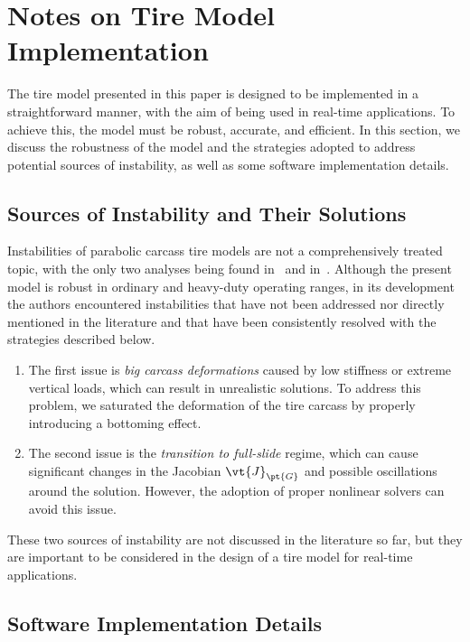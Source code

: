 
\section{Notes on Tire Model Implementation}

The tire model presented in this paper is designed to be implemented in a straightforward manner, with the aim of being used in real-time applications. To achieve this, the model must be robust, accurate, and efficient. In this section, we discuss the robustness of the model and the strategies adopted to address potential sources of instability, as well as some software implementation details.

\subsection{Sources of Instability and Their Solutions}

Instabilities of parabolic carcass tire models are not a comprehensively treated topic, with the only two analyses being found in~\citet{pacejka1971highway} and in~\citet{dehoogh2005implementing}. Although the present model is robust in ordinary and heavy-duty operating ranges, in its development the authors encountered instabilities that have not been addressed nor directly mentioned in the literature and that have been consistently resolved with the strategies described below.
%
\begin{enumerate}
  \setlength{\itemsep}{0.0em}
  \item The first issue is \emph{big carcass deformations} caused by low stiffness or extreme vertical loads, which can result in unrealistic solutions. To address this problem, we saturated the deformation of the tire carcass by properly introducing a bottoming effect.
  \item The second issue is the \emph{transition to full-slide} regime, which can cause significant changes in the Jacobian $\vt{J}_\pt{G}$ and possible oscillations around the solution. However, the adoption of proper nonlinear solvers can avoid this issue.
\end{enumerate}
%
These two sources of instability are not discussed in the literature so far, but they are important to be considered in the design of a tire model for real-time applications.

\subsection{Software Implementation Details}
\label{chap4:sec:software_implementation}

